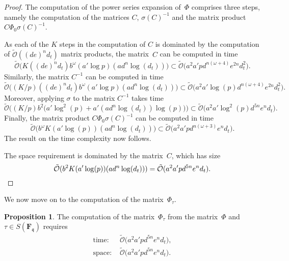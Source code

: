 \documentclass[a4paper,11pt]{article}
\numberwithin{equation}{section}
\newcommand{\FF}{\mathbf{F}} %
\providecommand{\SoftOh}{\tilde{\mathcal{O}}} %
\theoremstyle{definition}
\newtheorem{prop}[thm]{Proposition}
\begin{document}
\begin{proof}
The computation of the power series expansion of~$\Phi$ comprises 
three steps, namely the computation of the matrices $C$, $\sigma(C)^{-1}$ 
and the matrix product $C \Phi_0 \sigma(C)^{-1}$.

As each of the $K$ steps in the computation of $C$ is dominated by the 
computation of $\SoftOh((de)^n d_t)$ matrix products, the matrix~$C$ can be 
computed in time 
\begin{equation*}
\SoftOh\bigl(K ((de)^n d_t) b^{\omega} (a' \log p) (a d^n \log(d_t))\bigr) 
    \subset \SoftOh\bigl(a^2 a' p d^{n(\omega + 4)} e^{2n} d_t^2 \bigr).
\end{equation*}
Similarly, the matrix $C^{-1}$ can be computed in time 
\begin{equation*}
\SoftOh\bigl( (K/p) ((de)^n d_t) b^{\omega} (a' \log p) (ad^n \log(d_t)) \bigr)
    \subset \SoftOh\bigl( a^2 a' \log(p) d^{n(\omega+4)} e^{2n} d_t^2 \bigr). 
\end{equation*}
Moreover, applying $\sigma$ to the matrix $C^{-1}$ takes time 
\begin{equation*}
\SoftOh\bigl( (K/p) b^2 \bigl(a' \log^2(p) + a' (a d^n \log(d_t)) \log(p) \bigl) \bigr)
\subset \SoftOh\bigl( a^2 a' \log^2(p) d^{5n} e^n d_t \bigr).
\end{equation*}
Finally, the matrix product 
$C \Phi_0 \sigma(C)^{-1}$ can be computed in time 
\begin{equation*}
\SoftOh\bigl( b^{\omega} K (a' \log(p)) (a d^n \log(d_t)) \bigr) 
    \subset \SoftOh\bigl( a^2 a' p d^{n(\omega + 3)} e^n d_t \bigr).
\end{equation*}
The result on the time complexity now follows.

The space requirement is dominated by the matrix~$C$, which has size
\begin{equation*}
\SoftOh(b^2 K (a' \log(p)) (a d^n \log(d_t))) = \SoftOh(a^2 a' p d^{5n} e^n d_t). \qedhere
\end{equation*}
\end{proof}

We now move on to the computation of the matrix~$\Phi_{\tau}$.

\begin{prop}
The computation of the matrix~$\Phi_{\tau}$ from the matrix~$\Phi$ 
and $\tau \in S(\FF_{\mathfrak{q}})$ requires
\begin{align*}
\mbox{time: }  &\SoftOh\bigl(a^2 a' p d^{5n} e^n d_t \bigr), \\ 
\mbox{space: } &\SoftOh\bigl(a^2 a' p d^{5n} e^n d_t \bigr).
\end{align*}
\end{prop}
\end{document}
